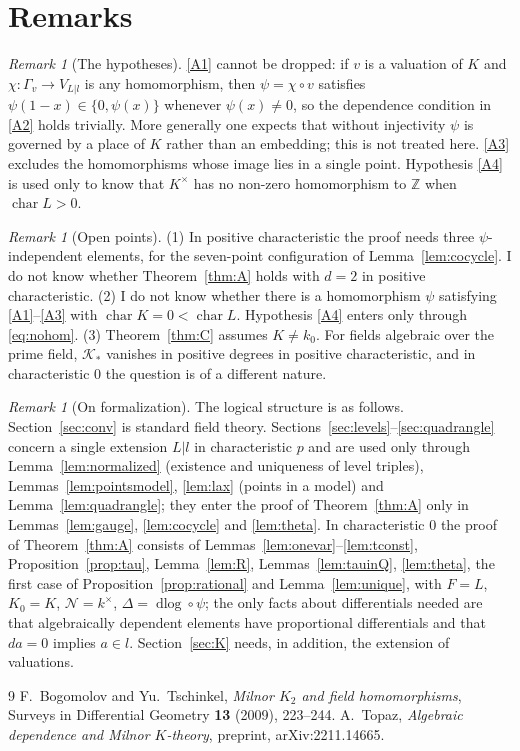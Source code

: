 \documentclass[11pt]{amsart}
\theoremstyle{definition}
\theoremstyle{remark}
\newtheorem{remark}[theorem]{Remark}
\newcommand{\ZZ}{\mathbb{Z}}
\newcommand{\chr}{\operatorname{char}}
\newcommand{\dlog}{\operatorname{dlog}}
\newcommand{\Kr}{\mathcal{K}}
\begin{document}
\section{Remarks}\label{sec:remarks}

\begin{remark}[The hypotheses]
\ref{A1} cannot be dropped: if $v$ is a valuation of $K$ and $\chi\colon\Gamma_v\to V_{L|l}$ is any homomorphism, then $\psi=\chi\circ v$ satisfies $\psi(1-x)\in\{0,\psi(x)\}$ whenever $\psi(x)\ne0$, so the dependence condition in \ref{A2} holds trivially.
More generally one expects that without injectivity $\psi$ is governed by a place of $K$ rather than an embedding; this is not treated here.
\ref{A3} excludes the homomorphisms whose image lies in a single point. Hypothesis \ref{A4} is used only to know that $K^\times$ has no non-zero homomorphism to $\ZZ$ when $\chr L>0$.
\end{remark}

\begin{remark}[Open points]
(1) In positive characteristic the proof needs three $\psi$-independent elements, for the seven-point configuration of Lemma~\ref{lem:cocycle}. I do not know whether Theorem~\ref{thm:A} holds with $d=2$ in positive characteristic.
(2) I do not know whether there is a homomorphism $\psi$ satisfying \ref{A1}--\ref{A3} with $\chr K=0<\chr L$. Hypothesis \ref{A4} enters only through \eqref{eq:nohom}.
(3) Theorem~\ref{thm:C} assumes $K\neq k_0$. For fields algebraic over the prime field, $\Kr_*$ vanishes in positive degrees in positive characteristic, and in characteristic $0$ the question is of a different nature.
\end{remark}

\begin{remark}[On formalization]
The logical structure is as follows. Section~\ref{sec:conv} is standard field theory. Sections~\ref{sec:levels}--\ref{sec:quadrangle} concern a single extension $L|l$ in characteristic $p$ and are used only through
Lemma~\ref{lem:normalized} (existence and uniqueness of level triples), Lemmas~\ref{lem:pointsmodel}, \ref{lem:lax} (points in a model) and Lemma~\ref{lem:quadrangle}; they enter the proof of Theorem~\ref{thm:A} only in Lemmas~\ref{lem:gauge}, \ref{lem:cocycle} and \ref{lem:theta}.
In characteristic $0$ the proof of Theorem~\ref{thm:A} consists of Lemmas~\ref{lem:onevar}--\ref{lem:tconst}, Proposition~\ref{prop:tau}, Lemma~\ref{lem:R}, Lemmas~\ref{lem:tauinQ}, \ref{lem:theta}, the first case of Proposition~\ref{prop:rational} and Lemma~\ref{lem:unique}, with $F=L$, $K_0=K$, $\mathcal N=k^\times$, $\Delta=\dlog\circ\psi$;
the only facts about differentials needed are that algebraically dependent elements have proportional differentials and that $da=0$ implies $a\in l$.
Section~\ref{sec:K} needs, in addition, the extension of valuations.
\end{remark}

\begin{thebibliography}{9}
 F.~Bogomolov and Yu.~Tschinkel, \emph{Milnor $K_2$ and field homomorphisms}, Surveys in Differential Geometry \textbf{13} (2009), 223--244.
 A.~Topaz, \emph{Algebraic dependence and Milnor $K$-theory}, preprint, arXiv:2211.14665.
\end{thebibliography}
\end{document}
